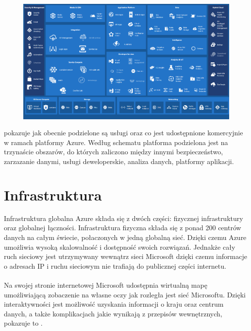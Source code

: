\begin{figure}[H]
    \includegraphics[width=\textwidth]{images/ms_azure}
    \label{fig:ms-azure}
\end{figure}

 pokazuje jak obecnie podzielone są usługi oraz co jest udostępnione komercyjnie w ramach platformy Azure. Według schematu platforma podzielona jest na trzynaście obszarów, do których zaliczono między innymi bezpieczeństwo, zarzazanie danymi, usługi deweloperskie, analiza danych, platformy aplikacji.

\section{Infrastruktura}
Infrastruktura globalna Azure składa się z dwóch części: fizycznej infrastruktury oraz globalnej łączności. Infrastruktura fizyczna składa się z ponad 200 centrów danych na całym świecie, połaczonych w jedną globalną sieć. Dzięki czemu Azure umożliwia wysoką skalowalność i dostępność swoich rozwiązań. Jednakże cały ruch sieciowy jest utrzymywany wewnątrz sieci Microsoft dzięki czemu informacje o adresach IP i ruchu sieciowym nie trafiają do publicznej części internetu\cite{MicrosoftAzureb}.
\\ \\
Na swojej stronie internetowej Microsoft udostępnia wirtualną mapę umożliwiającą zobaczenie na własne oczy jak rozległa jest sieć Microsoftu. Dzięki interaktywności jest możliwość uzyskania informacji o kraju oraz centrum danych, a także komplikacjach jakie wynikają z przepisów wewnętrznych, pokazuje to .

